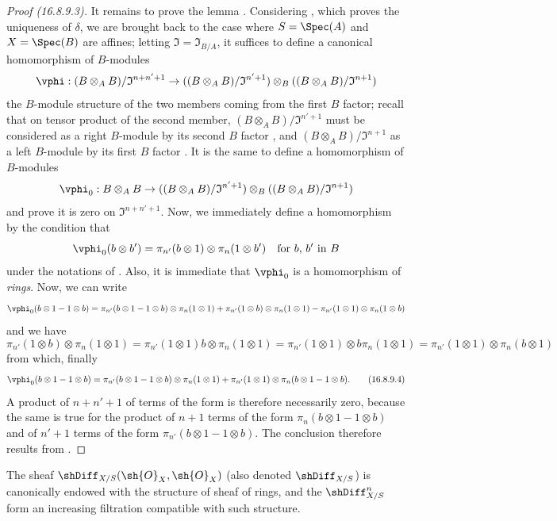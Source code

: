 \begin{proof}[Proof (16.8.9.3)]
It remains to prove the lemma .
Considering , which proves the uniqueness of $\delta$, we are brought back to the case where $S = \Spec(A)$ and $X = \Spec(B)$ are affines;
letting $\mathfrak{I} = \mathfrak{I}_{B/A}$, it suffices to define a canonical homomorphism of $B$-modules
\[
  \vphi: (B \otimes_A B)/\mathfrak{I}^{n+n'+1} \to ((B \otimes_A B)/\mathfrak{I}^{n' + 1}) \otimes_B ((B \otimes_A B)/\mathfrak{I}^{n + 1})
\]
the $B$-module structure of the two members coming from the first $B$ factor;
recall that on tensor product of the second member, $(B \otimes_A B)/\mathfrak{I}^{n' + 1}$ must be considered
as a right $B$-module by its second $B$ factor , and $(B \otimes_A B)/\mathfrak{I}^{n + 1}$ as a left $B$-module by its first $B$ factor .
It is the same to define a homomorphism of $B$-modules
\[
  \vphi_0: B \otimes_A B \to ((B \otimes_A B)/\mathfrak{I}^{n' + 1}) \otimes_B ((B \otimes_A B)/\mathfrak{I}^{n + 1})
\]
and prove it is zero on $\mathfrak{I}^{n+n'+1}$.
Now, we immediately define a homomorphism by the condition that
\[
  \vphi_0(b \otimes b') = \pi_{n'}(b \otimes 1) \otimes \pi_n(1 \otimes b') \quad \text{for $b$, $b'$ in $B$}
\]
under the notations of .
Also, it is immediate that $\vphi_0$ is a homomorphism of \emph{rings}.
Now, we can write 
\[
  \vphi_0(b \otimes 1 - 1 \otimes b) = \pi_{n'}(b \otimes 1 - 1 \otimes b) \otimes \pi_n(1 \otimes 1) + \pi_{n'}(1 \otimes b) \otimes \pi_n(1 \otimes 1) - \pi_{n'}(1 \otimes 1) \otimes \pi_n(1 \otimes b)
\]
and we have 
\[
  \pi_{n'}(1 \otimes b) \otimes \pi_n(1 \otimes 1) = \pi_{n'}(1 \otimes 1) b \otimes \pi_n(1 \otimes 1) = \pi_{n'}(1 \otimes 1) \otimes b \pi_n(1 \otimes 1) = \pi_{n'}(1 \otimes 1) \otimes \pi_n(b \otimes 1)
\]
from which, finally
\[
  \label{IV.16.8.9.4}
  \vphi_0(b \otimes 1 - 1 \otimes b) = \pi_{n'}(b \otimes 1 - 1 \otimes b) \otimes \pi_n(1 \otimes 1) + \pi_{n'}(1 \otimes 1) \otimes \pi_n(b \otimes 1 - 1 \otimes b). 
  \tag{16.8.9.4}
\]
A product of $n + n' + 1$ of terms of the form  is therefore necessarily zero, because the same is true for the product of $n+1$ terms of the form $\pi_n(b \otimes 1 - 1 \otimes b)$ and of $n' + 1$ terms of the form $\pi_{n'}(b \otimes 1 - 1 \otimes b)$.
The conclusion therefore results from .
\end{proof}

\begin{corollary}[16.8.10]
\label{IV.16.8.10}
The sheaf $\shDiff_{X/S}(\sh{O}_X, \sh{O}_X)$ (also denoted $\shDiff_{X/S}$) is canonically endowed with the structure of sheaf of rings, and the $\shDiff_{X/S}^n$ form an increasing filtration compatible with such structure.
\end{corollary}

